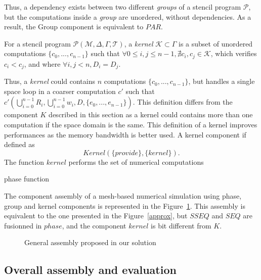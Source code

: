 Thus, a dependency exists between two different \emph{groups} of a stencil program $\mathcal{P}$, but the computations inside a \emph{group} are unordered, without dependencies. As a result, the Group component is equivalent to $PAR$.

\begin{mydef}
For a stencil program $\mathcal{P}(\mathcal{M},\Delta,\Gamma,\mathcal{T})$, a \emph{kernel} $\mathcal{K} \subset \Gamma$ is a subset of unordered computations $\{c_0,...,c_{n-1}\}$ such that $\forall 0 \leq i,j \leq n-1, \nexists c_i,c_j \in \mathcal{K}$, which verifies $c_i<c_j$, and where $\forall i,j<n, D_i=D_j$.
\end{mydef}

\medskip
Thus, a \emph{kernel} could contains $n$ computations $\{c_0,...,c_{n-1}\}$, but handles a single space loop in a coarser computation $c'$ such that $c'(\bigcup_{i=0}^{n-1}R_i,\bigcup_{i=0}^{n-1}w_i,D,\{e_0,...,e_{n-1}\})$. This definition differs from the component $K$ described in this section as a kernel could contains more than one computation if the space domain is the same. This definition of a kernel improves performances as the memory bandwidth is better used. A kernel component if defined as
\begin{equation}
Kernel(\{provide\},\{kernel\}).
\end{equation}
 The function $kernel$ performs the set of numerical computations

\begin{algorithm}[H]
 \caption{phase function}
 \end{algorithm}

\medskip
The component assembly of a mesh-based numerical simulation using phase, group and kernel components is represented in the Figure~\ref{phgpk}. This assembly is equivalent to the one presented in the Figure~\ref{approx}, but $SSEQ$ and $SEQ$ are fusionned in $phase$, and the component $kernel$ is bit different from $K$.

\begin{figure}[h!]
\begin{center}
\caption{General assembly proposed in our solution}
\label{phgpk}
\end{center}
\end{figure}

\subsection{Overall assembly and evaluation}